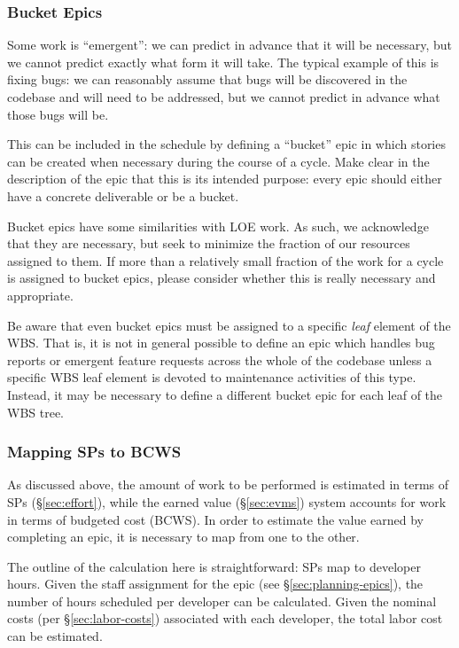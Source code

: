 \subsubsection{Bucket Epics}
\label{sec:bucket}

Some work is ``emergent'': we can predict in advance that it will be
necessary, but we cannot predict exactly what form it will take. The
typical example of this is fixing bugs: we can reasonably assume that
bugs will be discovered in the codebase and will need to be addressed,
but we cannot predict in advance what those bugs will be.

This can be included in the schedule by defining a ``bucket'' epic in
which stories can be created when necessary during the course of a
cycle. Make clear in the description of the epic that this is its
intended purpose: every epic should either have a concrete deliverable
or be a bucket.

Bucket epics have some similarities with LOE work. As such, we
acknowledge that they are necessary, but seek to minimize the fraction
of our resources assigned to them. If more than a relatively small
fraction of the work for a cycle is assigned to bucket epics, please
consider whether this is really necessary and appropriate.

Be aware that even bucket epics must be assigned to a specific
\emph{leaf} element of the WBS. That is, it is not in general possible
to define an epic which handles bug reports or emergent feature requests
across the whole of the codebase unless a specific WBS leaf element is
devoted to maintenance activities of this type. Instead, it may be
necessary to define a different bucket epic for each leaf of the WBS
tree.

\subsubsection{Mapping SPs to BCWS}
\label{sec:sps-to-bcws}

As discussed above, the amount of work to be performed is estimated in
terms of SPs (\S\ref{sec:effort}), while the
earned value (\S\ref{sec:evms}) system accounts for work
in terms of budgeted cost (BCWS). In order to estimate the value earned
by completing an epic, it is necessary to map from one to the other.

The outline of the calculation here is straightforward: SPs map to
developer hours. Given the
staff assignment for the
epic (see \S\ref{sec:planning-epics}), the number of hours scheduled per developer can be calculated.
Given the nominal costs (per \S\ref{sec:labor-costs})
associated with each developer, the total labor cost can be estimated.


